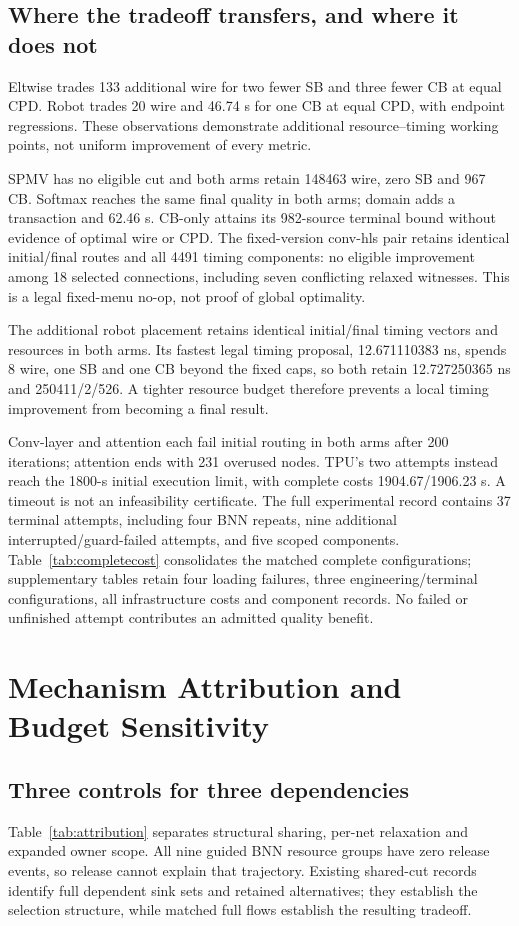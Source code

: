 \documentclass[conference,10pt]{IEEEtran}
\begin{document}
\subsection{Where the tradeoff transfers, and where it does not}
Eltwise trades 133 additional wire for two fewer SB and three fewer CB at equal CPD. Robot trades 20 wire and 46.74 s for one CB at equal CPD, with endpoint regressions. These observations demonstrate additional resource--timing working points, not uniform improvement of every metric.

SPMV has no eligible cut and both arms retain 148463 wire, zero SB and 967 CB. Softmax reaches the same final quality in both arms; domain adds a transaction and 62.46 s. CB-only attains its 982-source terminal bound without evidence of optimal wire or CPD. The fixed-version conv-hls pair retains identical initial/final routes and all 4491 timing components: no eligible improvement among 18 selected connections, including seven conflicting relaxed witnesses. This is a legal fixed-menu no-op, not proof of global optimality.

The additional robot placement retains identical initial/final timing vectors and resources in both arms. Its fastest legal timing proposal, 12.671110383 ns, spends 8 wire, one SB and one CB beyond the fixed caps, so both retain 12.727250365 ns and 250411/2/526. A tighter resource budget therefore prevents a local timing improvement from becoming a final result.

Conv-layer and attention each fail initial routing in both arms after 200 iterations; attention ends with 231 overused nodes. TPU's two attempts instead reach the 1800-s initial execution limit, with complete costs 1904.67/1906.23 s. A timeout is not an infeasibility certificate. The full experimental record contains 37 terminal attempts, including four BNN repeats, nine additional interrupted/guard-failed attempts, and five scoped components. Table~\ref{tab:completecost} consolidates the matched complete configurations; supplementary tables retain four loading failures, three engineering/terminal configurations, all infrastructure costs and component records. No failed or unfinished attempt contributes an admitted quality benefit.

\section{Mechanism Attribution and Budget Sensitivity}
\subsection{Three controls for three dependencies}
Table~\ref{tab:attribution} separates structural sharing, per-net relaxation and expanded owner scope. All nine guided BNN resource groups have zero release events, so release cannot explain that trajectory. Existing shared-cut records identify full dependent sink sets and retained alternatives; they establish the selection structure, while matched full flows establish the resulting tradeoff.
\end{document}
